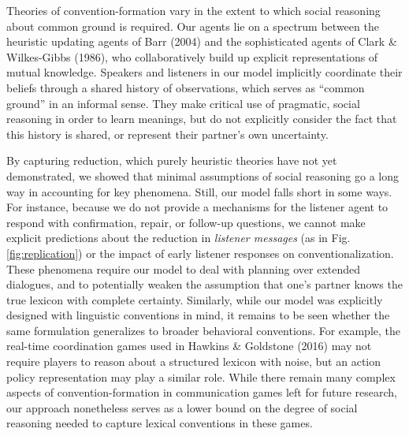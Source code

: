 Theories of convention-formation vary in the extent to which social
reasoning about common ground is required. Our agents lie on a spectrum
between the heuristic updating agents of Barr (2004) and the
sophisticated agents of Clark \& Wilkes-Gibbs (1986), who
collaboratively build up explicit representations of mutual knowledge.
Speakers and listeners in our model implicitly coordinate their beliefs
through a shared history of observations, which serves as ``common
ground'' in an informal sense. They make critical use of pragmatic,
social reasoning in order to learn meanings, but do not explicitly
consider the fact that this history is shared, or represent their
partner's own uncertainty.

By capturing reduction, which purely heuristic theories have not yet
demonstrated, we showed that minimal assumptions of social reasoning go
a long way in accounting for key phenomena. Still, our model falls short
in some ways. For instance, because we do not provide a mechanisms for
the listener agent to respond with confirmation, repair, or follow-up
questions, we cannot make explicit predictions about the reduction in
\emph{listener messages} (as in Fig. \ref{fig:replication}) or the
impact of early listener responses on conventionalization. These
phenomena require our model to deal with planning over extended
dialogues, and to potentially weaken the assumption that one's partner
knows the true lexicon with complete certainty. Similarly, while our
model was explicitly designed with linguistic conventions in mind, it
remains to be seen whether the same formulation generalizes to broader
behavioral conventions. For example, the real-time coordination games
used in Hawkins \& Goldstone (2016) may not require players to reason
about a structured lexicon with noise, but an action policy
representation may play a similar role. While there remain many complex
aspects of convention-formation in communication games left for future
research, our approach nonetheless serves as a lower bound on the degree
of social reasoning needed to capture lexical conventions in these
games.